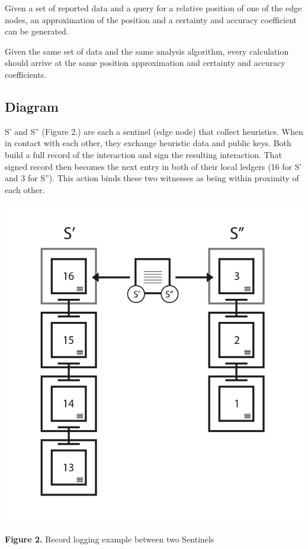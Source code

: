 \documentclass{article}
\begin{document}
Given a set of reported data and a query for a relative position of one of the edge nodes, an approximation of the position and a certainty and accuracy coefficient can be generated.

Given the same set of data and the same analysis algorithm, every calculation should arrive at the same position approximation and certainty and accuracy coefficients.

\subsection {Diagram}
S' and S'' (Figure 2.) are each a \Gls{sentinel} (edge node) that collect \glspl{heuristic}. When in contact with each other, they exchange heuristic data and public keys. Both build a full record of the interaction and sign the resulting interaction. That signed record then becomes the next entry in both of their local ledgers (16 for S' and 3 for S''). This action binds these two witnesses as being within proximity of each other.

\includegraphics [width=\textwidth]{boundwitness}
\begin{center}\textbf{Figure 2.}  Record logging example between two Sentinels
\end{center}
\end{document}
